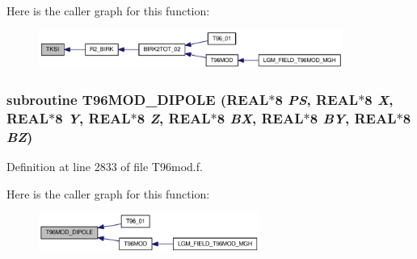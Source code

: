 Here is the caller graph for this function:\nopagebreak
\begin{figure}[H]
\begin{center}
\leavevmode
\includegraphics[width=282pt]{_t96mod_8f_2b6a113bedd0458c72d9e0723c3bb7d4_icgraph}
\end{center}
\end{figure}
\hypertarget{_t96mod_8f_39c75fa7da285932d582aadcf8a2442d}{
\subsubsection[{T96MOD\_\-DIPOLE}]{\setlength{\rightskip}{0pt plus 5cm}subroutine T96MOD\_\-DIPOLE (REAL$\ast$8 {\em PS}, \/  REAL$\ast$8 {\em X}, \/  REAL$\ast$8 {\em Y}, \/  REAL$\ast$8 {\em Z}, \/  REAL$\ast$8 {\em BX}, \/  REAL$\ast$8 {\em BY}, \/  REAL$\ast$8 {\em BZ})}}
\label{_t96mod_8f_39c75fa7da285932d582aadcf8a2442d}




Definition at line 2833 of file T96mod.f.

Here is the caller graph for this function:\nopagebreak
\begin{figure}[H]
\begin{center}
\leavevmode
\includegraphics[width=205pt]{_t96mod_8f_39c75fa7da285932d582aadcf8a2442d_icgraph}
\end{center}
\end{figure}
